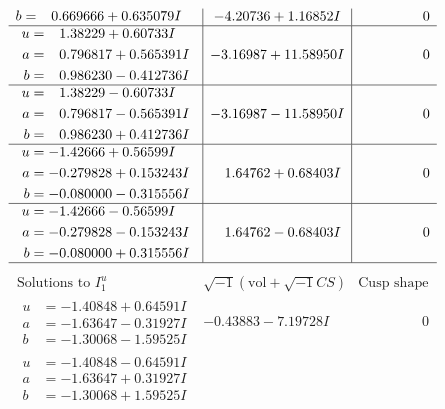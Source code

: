 \documentclass[1p]{elsarticle_modified}
\theoremstyle{definition}
\newcommand{\I}{\sqrt{-1}}
\begin{document}
$$\begin{array}{c|c|c}
\begin{aligned}
b &= \phantom{-}0.669666 + 0.635079 I\end{aligned}
 & -4.20736 + 1.16852 I & \phantom{-0.000000 } 0 \\ \hline\begin{aligned}
u &= \phantom{-}1.38229 + 0.60733 I \\
a &= \phantom{-}0.796817 + 0.565391 I \\
b &= \phantom{-}0.986230 - 0.412736 I\end{aligned}
 & -3.16987 + 11.58950 I & \phantom{-0.000000 } 0 \\ \hline\begin{aligned}
u &= \phantom{-}1.38229 - 0.60733 I \\
a &= \phantom{-}0.796817 - 0.565391 I \\
b &= \phantom{-}0.986230 + 0.412736 I\end{aligned}
 & -3.16987 - 11.58950 I & \phantom{-0.000000 } 0 \\ \hline\begin{aligned}
u &= -1.42666 + 0.56599 I \\
a &= -0.279828 + 0.153243 I \\
b &= -0.080000 - 0.315556 I\end{aligned}
 & \phantom{-}1.64762 + 0.68403 I & \phantom{-0.000000 } 0 \\ \hline\begin{aligned}
u &= -1.42666 - 0.56599 I \\
a &= -0.279828 - 0.153243 I \\
b &= -0.080000 + 0.315556 I\end{aligned}
 & \phantom{-}1.64762 - 0.68403 I & \phantom{-0.000000 } 0\\
 \hline 
 \end{array}$$\newpage$$\begin{array}{c|c|c}  
\text{Solutions to }I^u_{1}& \I (\text{vol} + \sqrt{-1}CS) & \text{Cusp shape}\\
 \hline 
\begin{aligned}
u &= -1.40848 + 0.64591 I \\
a &= -1.63647 - 0.31927 I \\
b &= -1.30068 - 1.59525 I\end{aligned}
 & -0.43883 - 7.19728 I & \phantom{-0.000000 } 0 \\ \hline\begin{aligned}
u &= -1.40848 - 0.64591 I \\
a &= -1.63647 + 0.31927 I \\
b &= -1.30068 + 1.59525 I\end{aligned}

\end{array}$$
\end{document}
